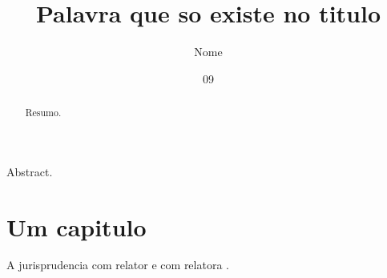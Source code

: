 \documentclass[dsc]{ufrj}
\title{Palavra que so existe no titulo}
\author{Nome}{Sobrenome}
\date{09}{2026}
\begin{document}
  \maketitle
  \frontmatter
  \begin{abstract}Resumo.\end{abstract}
  \begin{foreignabstract}Abstract.\end{foreignabstract}
  \tableofcontents
  \mainmatter
  \chapter{Um capitulo}
  A jurisprudencia com relator \citep{m-4262} e com relatora \citep{m-4262b}.
  \backmatter
  \printbibliography
\end{document}

